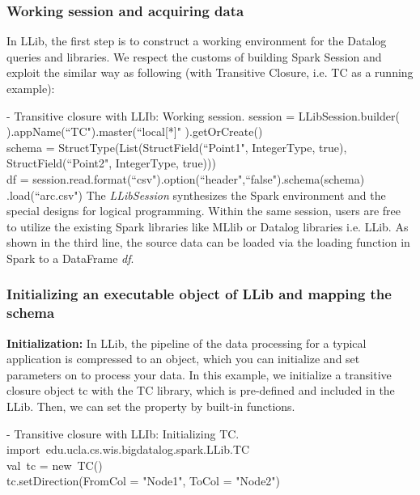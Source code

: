 \subsubsection{Working session and acquiring data}
\label{sec:data}
In LLib, the first step is to construct a working environment for the Datalog queries and libraries. We respect the customs of building Spark Session and exploit the similar way as following (with Transitive Closure, i.e. TC as a running example):


\vspace{0.5em}
 - Transitive closure with LLIb:  Working session.
\bldl
session = LLibSession.builder(
).appName(``TC").master(``local[*]"
).getOrCreate()\\

schema = StructType(List(StructField(``Point1", IntegerType, true),\\
StructField(``Point2", IntegerType, true)))\\

df = session.read.format(``csv").option(``header",``false").schema(schema)
.load(``arc.csv")
\eldl
The \textit{LLibSession} synthesizes the  Spark environment and the special designs for logical programming. Within the same session, users are free to utilize the existing Spark libraries like MLlib  or Datalog libraries i.e. LLib. As shown in the third line, the source data can be loaded via the loading function in Spark to a DataFrame \textit{df}. 

\subsubsection{Initializing an executable object of LLib and  mapping the schema}
\textbf{Initialization: }In LLib, the pipeline of the data processing for a typical application is compressed to an object, which you can initialize and set parameters on to process  your data. In this example, we initialize a transitive closure object tc with the TC library, which is pre-defined and included in the LLib. 
Then, we can set the property by built-in functions. 

\vspace{0.5em}
 - Transitive closure with LLIb:  Initializing TC.
\cldl
import\ edu.ucla.cs.wis.bigdatalog.spark.LLib.TC \\
val\ tc = new\ TC() \\

tc.setDirection(FromCol = "Node1", ToCol = "Node2")
\eldl

